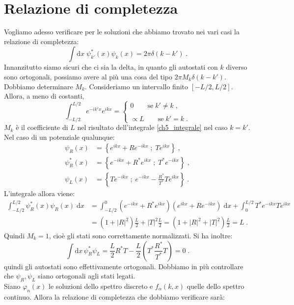 \documentclass[10pt,a4paper]{report}
\theoremstyle{definition}
\numberwithin{equation}{section}
\newcommand{\diff}[1][]{\mathrm{d}#1}
\begin{document}
\section{Relazione di completezza}
Vogliamo adesso verificare per le soluzioni che abbiamo trovato nei vari casi la relazione di completezza:
\begin{equation}
\int\diff{x}\; \psi_{k'}^*(x)\psi_k(x)=2\pi\delta(k-k')\;.
\end{equation}
Innanzitutto siamo sicuri che ci sia la delta, in quanto gli autostati con $k$ diverso sono ortogonali, possiamo avere al più una cosa del tipo $2\pi M_k\delta(k-k')$. Dobbiamo determinare $M_k$. Consideriamo un intervallo finito $[-L/2,L/2]$. Allora, a meno di costanti,
\begin{equation}
\int_{-L/2}^{L/2} e^{-ik'x}e^{ikx}=
\begin{cases}
0\qquad \mbox{se}\; k'\ne k\;, \\
\\
\propto L\qquad \mbox{se}\; k'=k\;.
\end{cases} \label{ch5_integrale}
\end{equation}
$M_k$ è il coefficiente di $L$ nel risultato dell'integrale \eqref{ch5_integrale} nel caso $k=k'$. Nel caso di un potenziale qualunque:
\begin{align*}
\psi_R(x)&=\left\{ e^{ikx}+Re^{-ikx}\; ;\; Te^{ikx}\right\}\;, \\
\psi^*_R(x) &= \left\{ e^{-ikx}+R^*e^{ikx}\; ; \; T^*e^{-ikx}\right\}\;, \\
\psi_L(x) &= \left\{ Te^{-ikx} \; ; \; e^{-ikx}-\frac{R^*}{T^*}T e^{ikx}\right\}\;.
\end{align*}
L'integrale allora viene:
\begin{align*}
\int_{-L/2}^{L/2} \psi^*_R(x)\psi_R(x)\;\diff{x}&=\int_{-L/2}^0 (e^{-ikx}+R^*e^{ikx})(e^{ikx}+Re^{-ikx})\;\diff{x}+
\int_0^{L/2} T^*e^{-ikx}Te^{ikx} \\
&= (1+|R|^2)\frac{L}{2}+|T|^2\frac{L}{2}=(1+|R|^2+|T|^2)\frac{L}{2}=L\;.
\end{align*}
Quindi $M_k=1$, cioè gli stati sono correttamente normalizzati. Si ha inoltre:
\begin{equation}
\int\diff{x}\,\psi_R^*\psi_L= \frac{L}{2}R^*T-\frac{L}{2}\left(T^*\frac{R^*}{T^*}T\right)=0\;.
\end{equation}
quindi gli autostati sono effettivamente ortogonali. Dobbiamo in più controllare che $\psi_R,\psi_L$ siano ortogonali agli stati legati. \\
Siano $\varphi_n(x)$ le soluzioni dello spettro discreto e $f_{\alpha}(k,x)$ quelle dello spettro continuo. Allora la relazione di completezza che dobbiamo verificare sarà:
\end{document}
